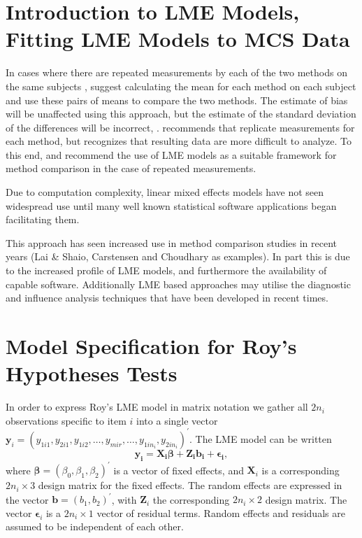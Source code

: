 \documentclass[12pt, a4paper]{report}
\theoremstyle{plain}
\theoremstyle{definition}
\theoremstyle{remark}
\begin{document}
\section{Introduction to LME Models, Fitting LME Models to MCS Data}

In cases where there are repeated measurements by each of the two methods on the same subjects , \citet{BA99} suggest calculating
the mean for each method on each subject and use these pairs of means to compare the two methods. The estimate of bias will be unaffected using this approach, but the estimate of the standard deviation of the differences will be incorrect, \citep{BXC2004}. \citet{BXC2004} recommends that replicate measurements for each method, but recognizes that resulting data are more difficult to analyze. To this end, \citet{BXC2004} and \citet{BXC2008} recommend the use of LME models as a suitable framework for method comparison in the case of repeated measurements.

Due to computation complexity, linear mixed effects models have not seen widespread use until many well known statistical software applications began facilitating them. 

This approach has seen increased use in method comparison studies in recent years (Lai \& Shaio, Carstensen and Choudhary as examples). In part this is due to the increased profile of LME models, and furthermore the availability of capable software. Additionally LME based approaches may utilise the diagnostic and influence analysis techniques that have been developed in recent times.




\section{Model Specification for Roy's Hypotheses Tests}

In order to express Roy's LME model in matrix notation we gather all $2n_i$ observations specific to item $i$ into a single vector  $\boldsymbol{y}_{i} = (y_{1i1},y_{2i1},y_{1i2},\ldots,y_{mir},\ldots,y_{1in_{i}},y_{2in_{i}})^\prime.$ The LME model can be written
\[
\boldsymbol{y_{i}} = \boldsymbol{X_{i}\beta} + \boldsymbol{Z_{i}b_{i}} + \boldsymbol{\epsilon_{i}},
\]
where $\boldsymbol{\beta}=(\beta_0,\beta_1,\beta_2)^\prime$ is a vector of fixed effects, and $\boldsymbol{X}_i$ is a corresponding $2n_i\times 3$ design matrix for the fixed effects. The random effects are expressed in the vector $\boldsymbol{b}=(b_1,b_2)^\prime$, with $\boldsymbol{Z}_i$ the corresponding $2n_i\times 2$ design matrix. The vector $\boldsymbol{\epsilon}_i$ is a $2n_i\times 1$ vector of residual terms. Random effects and residuals are assumed to be independent of each other.
\end{document}
